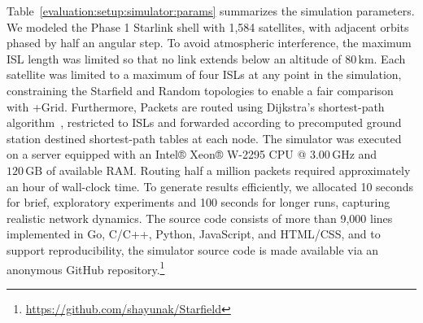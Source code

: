 \documentclass[acmsmall, screen]{acmart}
\begin{document}
Table~\ref{evaluation:setup:simulator:params} summarizes the simulation parameters. We modeled the Phase 1 Starlink shell with 1,584 satellites, with adjacent orbits phased by half an angular step. To avoid atmospheric interference, the maximum ISL length was limited so that no link extends below an altitude of $80\,\text{km}$. Each satellite was limited to a maximum of four ISLs at any point in the simulation, constraining the Starfield and Random topologies to enable a fair comparison with +Grid. Furthermore, Packets are routed using Dijkstra’s shortest-path algorithm~\cite{dijkstra2022note}, restricted to ISLs and forwarded according to precomputed ground station destined shortest-path tables at each node. The simulator was executed on a server equipped with an Intel® Xeon® W-2295 CPU @ $3.00\,\text{GHz}$ and $120\,\text{GB}$ of available RAM. Routing half a million packets required approximately an hour of wall-clock time. To generate results efficiently, we allocated 10 seconds for brief, exploratory experiments and 100 seconds for longer runs, capturing realistic network dynamics. The source code consists of more than 9,000 lines implemented in Go, C/C++, Python, JavaScript, and HTML/CSS, and to support reproducibility, the simulator source code is made available via an anonymous GitHub repository.\footnote{\url{https://github.com/shayunak/Starfield}}
\end{document}
